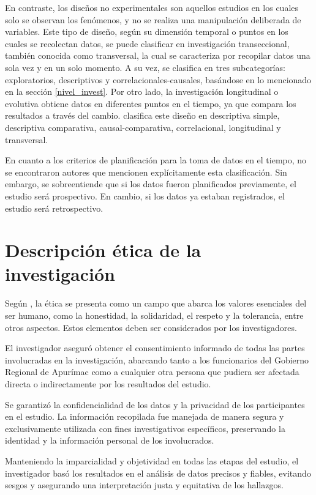 En contraste, los diseños no experimentales son aquellos estudios en los cuales solo se observan los fenómenos, y no se realiza una manipulación deliberada de variables. Este tipo de diseño, según su dimensión temporal o puntos en los cuales se recolectan datos, se puede clasificar en investigación transeccional, también conocida como transversal, la cual se caracteriza por recopilar datos una sola vez y en un solo momento. A su vez, se clasifica en tres subcategorías: exploratorios, descriptivos y correlacionales-causales, basándose en lo mencionado en la sección \ref{nivel_invest}. Por otro lado, la investigación longitudinal o evolutiva obtiene datos en diferentes puntos en el tiempo, ya que compara los resultados a través del cambio.\cite[341]{NaupasPaitan2014} clasifica este diseño en descriptiva simple, descriptiva comparativa, causal-comparativa, correlacional, longitudinal y transversal.

En cuanto a los criterios de planificación para la toma de datos en el tiempo, no se encontraron autores que mencionen explícitamente esta clasificación. Sin embargo, se sobreentiende que si los datos fueron planificados previamente, el estudio será prospectivo. En cambio, si los datos ya estaban registrados, el estudio será retrospectivo.

\section{Descripción ética de la investigación}

Según \cite[]{AbreuSuarez2017}, la ética se presenta como un campo que abarca los valores esenciales del ser humano, como la honestidad, la solidaridad, el respeto y la tolerancia, entre otros aspectos. Estos elementos deben ser considerados por los investigadores.

El investigador aseguró obtener el consentimiento informado de todas las partes involucradas en la investigación, abarcando tanto a los funcionarios del Gobierno Regional de Apurímac como a cualquier otra persona que pudiera ser afectada directa o indirectamente por los resultados del estudio.

Se garantizó la confidencialidad de los datos y la privacidad de los participantes en el estudio. La información recopilada fue manejada de manera segura y exclusivamente utilizada con fines investigativos específicos, preservando la identidad y la información personal de los involucrados.

Manteniendo la imparcialidad y objetividad en todas las etapas del estudio, el investigador basó los resultados en el análisis de datos precisos y fiables, evitando sesgos y asegurando una interpretación justa y equitativa de los hallazgos.

